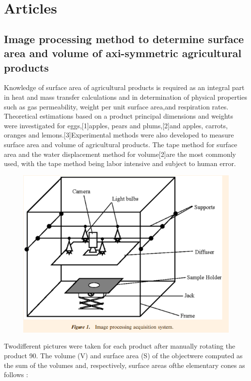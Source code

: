 \documentclass[15pt,parskip=full,a4paper]{book}
\begin{document}
	\chapter{Articles}
	\section{ Image processing method to determine surface area and volume of axi-symmetric agricultural products}
Knowledge of surface area of agricultural products is required as an integral part in heat and mass transfer calculations and in determination of physical properties such as gas permeability, weight per unit surface area,and respiration rates. Theoretical estimations based on a product principal dimensions and weights were investigated for eggs,[1]apples, pears and plums,[2]and apples, carrots, oranges and lemons.[3]Experimental methods were also developed to measure surface area and volume of agricultural products. The tape method for surface area and the water displacement method for volume[2]are the most commonly used, with the tape method being labor intensive and subject to human error.

\begin{figure}[h]
	\centering
	\includegraphics[width=0.5\linewidth]{imgs/1}
	\caption{}
	\label{fig:1}
\end{figure}

Twodifferent pictures were taken for each product after manually rotating the product 90. The volume (V) and surface area (S) of the objectwere computed as the sum of the volumes and, respectively, surface areas ofthe elementary cones as follows :
\end{document}
